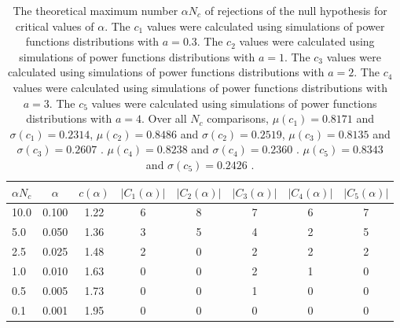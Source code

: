 \begin{table}[h!]
\begin{center}
\begin{tabular}{| l | c | c | c | c | c | c | c |}\hline
$\alpha N_c$ & $\alpha$ & $c(\alpha)$ & $|C_1(\alpha)|$ & $|C_2(\alpha)|$ & $|C_3(\alpha)|$ & $|C_4(\alpha)|$ & $|C_5(\alpha)|$ \\\hline
10.0 & 0.100 & 1.22 & 6 & 8 & 7 & 6 & 7 \\\hline
5.0 & 0.050 & 1.36 & 3 & 5 & 4 & 2 & 5 \\\hline
2.5 & 0.025 & 1.48 & 2 & 0 & 2 & 2 & 2 \\\hline
1.0 & 0.010 & 1.63 & 0 & 0 & 2 & 1 & 0 \\\hline
0.5 & 0.005 & 1.73 & 0 & 0 & 1 & 0 & 0 \\\hline
0.1 & 0.001 & 1.95 & 0 & 0 & 0 & 0 & 0 \\\hline
\end{tabular}
\caption{The theoretical maximum number $\alpha N_c$ of rejections
of the null hypothesis for critical values of $\alpha$.
The $c_1$ values were calculated using simulations of power functions distributions with $a=0.3$.
The $c_2$ values were calculated using simulations of power functions distributions with $a=1$.
The $c_3$ values were calculated using simulations of power functions distributions with $a=2$.
The $c_4$ values were calculated using simulations of power functions distributions with $a=3$.
The $c_5$ values were calculated using simulations of power functions distributions with $a=4$.
Over all $N_c$ comparisons,
 $\mu(c_1)=0.8171$ and $\sigma(c_1)=0.2314$,
 $\mu(c_2)=0.8486$ and $\sigma(c_2)=0.2519$,
 $\mu(c_3)=0.8135$ and $\sigma(c_3)=0.2607$ .
 $\mu(c_4)=0.8238$ and $\sigma(c_4)=0.2360$ .
 $\mu(c_5)=0.8343$ and $\sigma(c_5)=0.2426$ .
}
\end{center}
\end{table}